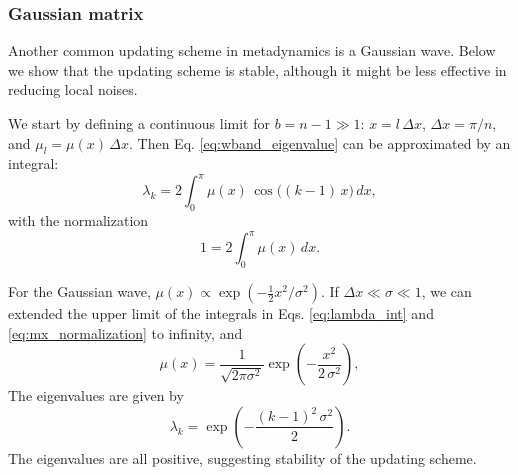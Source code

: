 \documentclass[reprint]{revtex4-1}
\begin{document}
\subsubsection{Gaussian matrix}



Another common updating scheme
in metadynamics is a Gaussian wave.
%
Below we show that the updating scheme
is stable, although
it might be less effective
in reducing local noises.



We start by defining
a continuous limit
for $b = n - 1 \gg 1$:
$x = l \, \Delta x$,
$\Delta x = \pi/n$,
and
$\mu_l = \mu(x) \, \Delta x$.
%
Then
Eq. \eqref{eq:wband_eigenvalue}
can be approximated by an integral:
%
\begin{equation}
\lambda_k
=
2 \int_0^\pi
  \mu(x) \, \cos \bigl( (k-1) \, x \bigr) \, dx,
\label{eq:lambda_int}
\end{equation}
%
with the normalization
%
\begin{equation}
1 = 2 \int_0^\pi \mu(x) \, dx.
\label{eq:mx_normalization}
\end{equation}



For the Gaussian wave,
$\mu(x) \propto \exp(-\frac{1}{2} x^2/\sigma^2)$.
%
If $\Delta x \ll \sigma \ll 1$,
we can extended
the upper limit of the integrals
in Eqs. \eqref{eq:lambda_int}
and \eqref{eq:mx_normalization}
to infinity, and
%
\begin{equation}
\mu(x)
=
\frac{            1            }
     { \sqrt{ 2 \pi \sigma^2 } }
%
\exp\left(
      -\frac{       x^2     }
            { 2 \, \sigma^2 }
    \right),
\end{equation}
%
%
The eigenvalues are given by
%
\begin{equation}
\lambda_k
=
\exp\left(
      -\frac{ (k - 1)^2 \, \sigma^2 }
            {           2           }
    \right).
\label{eq:lambda_Gaussian}
\end{equation}
%
The eigenvalues are all positive,
suggesting stability of the updating scheme.
\end{document}
